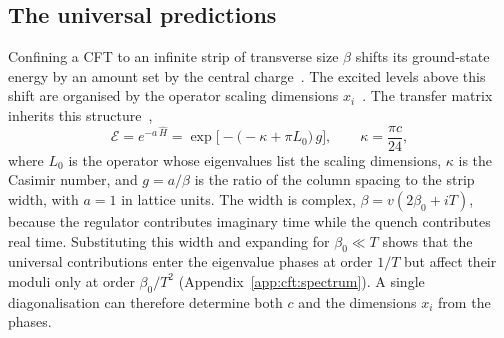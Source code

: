 \subsection{The universal predictions}
\label{sec:cft:temporal}
\label{sec:emergent}

Confining a \ac{CFT} to an infinite strip of transverse size $\beta$ shifts its ground-state energy by an amount set by the central charge~\cite{blote_cardy_nightingale1986}. The excited levels above this shift are organised by the operator scaling dimensions $x_i$~\cite{cardy1984}. The transfer matrix inherits this structure~\cite{carignano_tagliacozzo2025},
\begin{equation}
  \mathcal{E} = e^{-a\,\hat H}= \exp\!\Big[-\big(-\kappa + \pi L_0\big)\,g\Big],
  \qquad \kappa = \frac{\pi c}{24},
  \label{eq:cft:transfer}
\end{equation}
where $L_0$ is the operator whose eigenvalues list the scaling dimensions, $\kappa$ is the Casimir number, and $g=a/\beta$ is the ratio of the column spacing to the strip width, with $a=1$ in lattice units. The width is complex, $\beta=v(2\beta_0+iT)$, because the regulator contributes imaginary time while the quench contributes real time. Substituting this width and expanding for $\beta_0\ll T$ shows that the universal contributions enter the eigenvalue phases at order $1/T$ but affect their moduli only at order $\beta_0/T^2$ (Appendix~\ref{app:cft:spectrum}). A single diagonalisation can therefore determine both $c$ and the dimensions $x_i$ from the phases.

